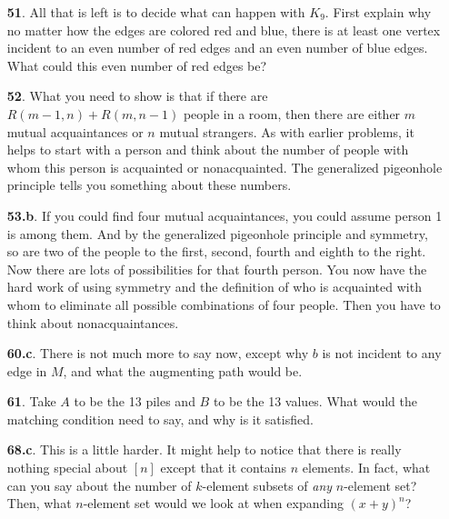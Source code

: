 \documentclass[10pt,]{book}
\theoremstyle{plain}
\theoremstyle{definition}
\theoremstyle{definition}
\theoremstyle{definition}
\numberwithin{equation}{chapter}
\begin{document}
\begin{itemize}[itemsep=1em]
\item[\textbf{51}.]\hypertarget{p-416}{}%
All that is left is to decide what can happen with \(K_9\).  First explain why no matter how the edges are colored red and blue, there is at least one vertex incident to an even number of red edges and an even number of blue edges.  What could this even number of red edges be?%

\item[\textbf{52}.]\hypertarget{p-420}{}%
What you need to show is that if there are \(R(m - 1, n) + R(m, n - 1)\) people in a room, then there are either \(m\) mutual acquaintances or \(n\) mutual strangers. As with earlier problems, it helps to start with a person and think about the number of people with whom this person is acquainted or nonacquainted. The generalized pigeonhole principle tells you something about these numbers.%

\item[\textbf{53.b}.]\hypertarget{p-425}{}%
If you could find four mutual acquaintances, you could assume person 1 is among them. And by the generalized pigeonhole principle and symmetry, so are two of the people to the first, second, fourth and eighth to the right. Now there are lots of possibilities for that fourth person. You now have the hard work of using symmetry and the definition of who is acquainted with whom to eliminate all possible combinations of four people. Then you have to think about nonacquaintances.%

\item[\textbf{60.c}.]\hypertarget{p-456}{}%
There is not much more to say now, except why \(b\) is not incident to any edge in \(M\), and what the augmenting path would be.%

\item[\textbf{61}.]\hypertarget{p-459}{}%
Take \(A\) to be the 13 piles and \(B\) to be the 13 values.  What would the matching condition need to say, and why is it satisfied.%

\item[\textbf{68.c}.]\hypertarget{p-510}{}%
This is a little harder.  It might help to notice that there is really nothing special about \([n]\) except that it contains \(n\) elements.  In fact, what can you say about the number of \(k\)-element subsets of \emph{any} \(n\)-element set?  Then, what \(n\)-element set would we look at when expanding \((x+y)^n\)?%


\end{itemize}
\end{document}
